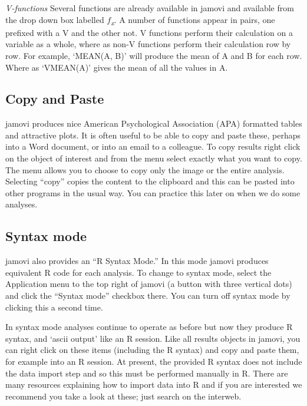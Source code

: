 \documentclass[
]{book}
\begin{document}
\emph{V-functions}
Several functions are already available in jamovi and available from the drop down box labelled \emph{\(f\)\textsubscript{x}}. A number of functions appear in pairs, one prefixed with a V and the other not. V functions perform their calculation on a variable as a whole, where as non-V functions perform their calculation row by row. For example, `MEAN(A, B)' will produce the mean of A and B for each row. Where as `VMEAN(A)' gives the mean of all the values in A.

\hypertarget{copypaste}{%
\subsection{Copy and Paste}\label{copypaste}}

jamovi produces nice American Psychological Association (APA) formatted tables and attractive plots. It is often useful to be able to copy and paste these, perhaps into a Word document, or into an email to a colleague. To copy results right click on the object of interest and from the menu select exactly what you want to copy. The menu allows you to choose to copy only the image or the entire analysis. Selecting ``copy'' copies the content to the clipboard and this can be pasted into other programs in the usual way. You can practice this later on when we do some analyses.

\hypertarget{syntaxmode}{%
\subsection{Syntax mode}\label{syntaxmode}}

jamovi also provides an ``R Syntax Mode.'' In this mode jamovi produces equivalent R code for each analysis. To change to syntax mode, select the Application menu to the top right of jamovi (a button with three vertical dots) and click the ``Syntax mode'' checkbox there. You can turn off syntax mode by clicking this a second time.

In syntax mode analyses continue to operate as before but now they produce R syntax, and `ascii output' like an R session. Like all results objects in jamovi, you can right click on these items (including the R syntax) and copy and paste them, for example into an R session. At present, the provided R syntax does not include the data import step and so this must be performed manually in R. There are many resources explaining how to import data into R and if you are interested we recommend you take a look at these; just search on the interweb.
\end{document}
